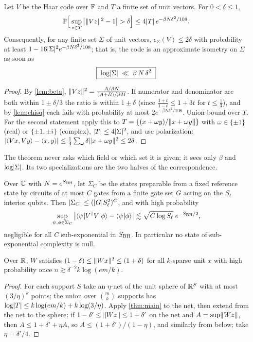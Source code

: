 \begin{theorem}\label{thm:main}\proved
Let $V$ be the Haar code over $\mathbb F$ and $T$ a finite set of unit vectors. For $0<\delta\le1$,
\[
\Pr\Big[\sup_{z\in T}\big|\norm{Vz}^2-1\big|>\delta\Big]\le4\abs T\,e^{-\beta N\delta^2/108}.
\]
Consequently, for any finite set $\Sigma$ of unit vectors, $\epsilon_\Sigma(V)\le2\delta$ with probability at least
$1-16\lvert \Sigma\rvert^2e^{-\beta N\delta^2/108}$; that is, the code is an approximate isometry on $\Sigma$ as soon as
\begin{equation}\label{eq:condition}
\boxed{\;\log\lvert \Sigma\rvert\;\ll\;\beta\,N\,\delta^2\;}
\end{equation}
\end{theorem}
\begin{proof}
By \cref{lem:beta}, $\lVert Vz\rVert^2=\frac{A/\beta N}{(A+B)/\beta M}$. If numerator and denominator are both within
$1\pm\delta/3$ the ratio is within $1\pm\delta$ (since $\frac{1+t}{1-t}\le1+3t$ for $t\le\frac13$), and by
\cref{lem:chisq} each fails with probability at most $2e^{-\beta N\delta^2/108}$. Union-bound over $T$. For the
second statement apply this to $T=\{(x+\omega y)/\lVert x+\omega y\rVert\}$ with $\omega\in\{\pm1\}$ (real) or
$\{\pm1,\pm i\}$ (complex), $\lvert T\rvert\le4\lvert \Sigma\rvert^2$, and use polarization:
$\lvert \langle Vx,Vy\rangle-\langle x,y\rangle\rvert\le\frac14\sum_\omega\delta\lVert x+\omega y\rVert^2\le2\delta$.
\end{proof}

The theorem never asks which field or which set it is given; it sees only $\beta$ and $\log\lvert \Sigma\rvert$. Its two
specializations are the two halves of the correspondence.

\begin{corollary}\label{cor:aehpv}\proved
Over $\mathbb C$ with $N=e^{S_{\rm BH}}$, let $\Sigma_C$ be the states preparable from a fixed reference state by circuits of
at most $C$ gates from a finite gate set $G$ acting on the $S_\ell$ interior qubits. Then
$\lvert \Sigma_C\rvert\le(\lvert G\rvert S_\ell^2)^C$, and with high probability
\[
\sup_{\psi,\phi\in\Sigma_C}\big|\langle \psi| V^\dagger V|\phi\rangle-\langle \psi|\phi\rangle\big|\lesssim\sqrt{C\log S_\ell}\;e^{-S_{\rm BH}/2},
\]
negligible for all $C$ sub-exponential in $S_{\rm BH}$. In particular no state of sub-exponential complexity is null.
\end{corollary}

\begin{corollary}\label{cor:rip}\proved
Over $\mathbb R$, $W$ satisfies $(1-\delta)\le\lVert Wx\rVert^2\le(1+\delta)$ for all $k$-sparse unit $x$ with high probability
once $n\gtrsim\delta^{-2}k\log(em/k)$.
\end{corollary}
\begin{proof}
For each support $S$ take an $\eta$-net of the unit sphere of $\mathbb R^S$ with at most $(3/\eta)^k$ points; the union
over $\binom mk$ supports has $\log\lvert T\rvert\le k\log(em/k)+k\log(3/\eta)$. Apply \cref{thm:main} to the net, then
extend from the net to the sphere: if $1-\delta'\le\lVert Wz\rVert\le1+\delta'$ on the net and $A=\sup\lVert Wz\rVert$, then
$A\le1+\delta'+\eta A$, so $A\le(1+\delta')/(1-\eta)$, and similarly from below; take $\eta=\delta'/4$.
\end{proof}

